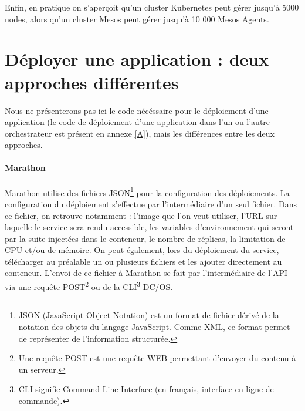 \documentclass[11pt,fleqn]{book} %
\begin{document}
Enfin, en pratique on s'aperçoit qu'un cluster Kubernetes peut gérer jusqu'à 5000 nodes, alors qu'un cluster Mesos peut gérer jusqu'à 10 000 Mesos Agents.

\section{Déployer une application : deux approches différentes}
Nous ne présenterons pas ici le code nécéssaire pour le déploiement d'une application (le code de déploiement d'une application dans l'un ou l'autre orchestrateur est présent en annexe \ref{A}), mais les différences entre les deux approches.
\paragraph{Marathon}
 Marathon utilise des fichiers JSON\footnote{JSON (JavaScript Object Notation) est un format de fichier dérivé de la notation des objets du langage JavaScript. Comme XML, ce format permet de représenter de l’information structurée.} pour la configuration des déploiements. La configuration du déploiement s'effectue par l'intermédiaire d'un seul fichier. Dans ce fichier, on retrouve notamment : l'image que l'on veut utiliser, l'URL sur laquelle le service sera rendu accessible, les variables d'environnement qui seront par la suite injectées dans le conteneur, le nombre de réplicas, la limitation de CPU et/ou de mémoire. On peut également, lors du déploiement du service, télécharger au préalable un ou plusieurs fichiers et les ajouter directement au conteneur.  L'envoi de ce fichier à Marathon se fait par l'intermédiaire de l'API via une requête POST\footnote{Une requête POST est une requête WEB permettant d'envoyer du contenu à un serveur.} ou de la CLI\footnote{CLI signifie Command Line Interface (en français, interface en ligne de commande).} DC/OS.
 
\end{document}
